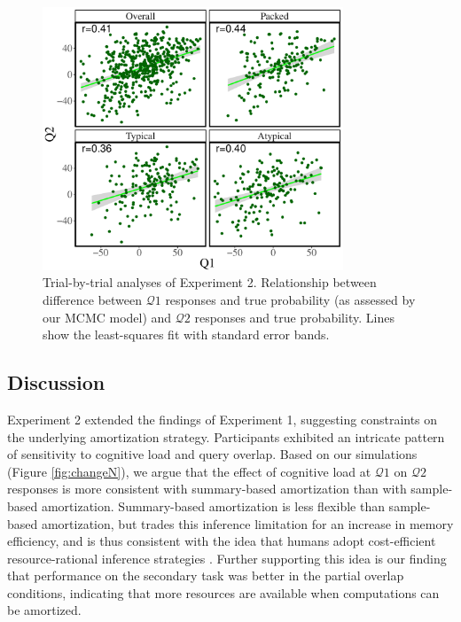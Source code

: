 \begin{figure}
\centering
\includegraphics[width=0.8\textwidth]{figures/exp2correspondence.pdf}
\caption{Trial-by-trial analyses of Experiment 2. Relationship between difference between $\mathcal{Q}1$ responses and true probability (as assessed by our MCMC model) and $\mathcal{Q}2$ responses and true probability. Lines show the least-squares fit with standard error bands.}
\label{fig:correspondence2}
\end{figure}

\subsection{Discussion}

Experiment 2 extended the findings of Experiment 1, suggesting constraints on the underlying amortization strategy. Participants exhibited an intricate pattern of sensitivity to cognitive load and query overlap. Based on our simulations (Figure \ref{fig:changeN}), we argue that the effect of cognitive load at $\mathcal{Q}1$ on $\mathcal{Q}2$ responses is more consistent with summary-based amortization than with sample-based amortization. Summary-based amortization is less flexible than sample-based amortization, but trades this inference limitation for an increase in memory efficiency, and is thus consistent with the idea that humans adopt cost-efficient resource-rational inference strategies \citep{gershman2015computational,griffiths2015,lieder2017anchoring}. Further supporting this idea is our finding that performance on the secondary task was better in the partial overlap conditions, indicating that more resources are available when computations can be amortized. 

